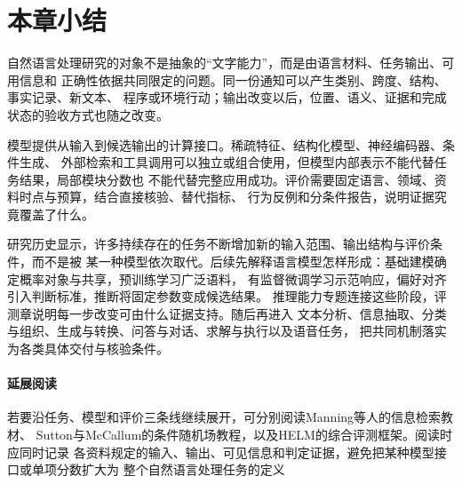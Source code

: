 \section{本章小结}
\label{sec:nlp-introduction-summary}

自然语言处理研究的对象不是抽象的“文字能力”，而是由语言材料、任务输出、可用信息和
正确性依据共同限定的问题。同一份通知可以产生类别、跨度、结构、事实记录、新文本、
程序或环境行动；输出改变以后，位置、语义、证据和完成状态的验收方式也随之改变。

模型提供从输入到候选输出的计算接口。稀疏特征、结构化模型、神经编码器、条件生成、
外部检索和工具调用可以独立或组合使用，但模型内部表示不能代替任务结果，局部模块分数也
不能代替完整应用成功。评价需要固定语言、领域、资料时点与预算，结合直接核验、替代指标、
行为反例和分条件报告，说明证据究竟覆盖了什么。

研究历史显示，许多持续存在的任务不断增加新的输入范围、输出结构与评价条件，而不是被
某一种模型依次取代。后续先解释语言模型怎样形成：基础建模确定概率对象与共享，预训练学习广泛语料，
有监督微调学习示范响应，偏好对齐引入判断标准，推断将固定参数变成候选结果。
推理能力专题连接这些阶段，评测章说明每一步改变可由什么证据支持。随后再进入
文本分析、信息抽取、分类与组织、生成与转换、问答与对话、求解与执行以及语音任务，
把共同机制落实为各类具体交付与核验条件。

\paragraph{延展阅读}
若要沿任务、模型和评价三条线继续展开，可分别阅读Manning等人的信息检索教材、
Sutton与McCallum的条件随机场教程，以及HELM的综合评测框架。阅读时应同时记录
各资料规定的输入、输出、可见信息和判定证据，避免把某种模型接口或单项分数扩大为
整个自然语言处理任务的定义

